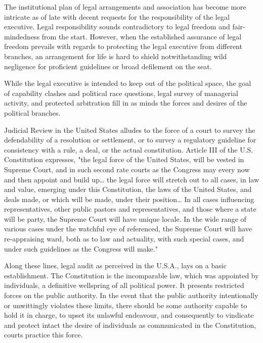 \begin{multicols}{2}
\vspace{.02cm}

\noi
The institutional plan of legal arrangements and association has become more intricate as of
late with decent requests for the responsibility of the legal executive. Legal responsibility
sounds contradictory to legal freedom and fair-mindedness from the start. However, when the
established assurance of legal freedom prevails with regards to protecting the legal executive
from different branches, an arrangement for life is hard to shield notwithstanding wild
negligence for proficient guidelines or broad defilement on the seat. 

\vspace{-.1cm}

\noi
While the legal executive is intended to keep out of the political space, the goal of capability
clashes and political race questions, legal survey of managerial activity, and protected
arbitration fill in as minds the forces and desires of the political branches.

\vspace{-.1cm}


\vspace{-.1cm}

\noi
Judicial Review in the United States alludes to the force of a court to survey the defendability
of a resolution or settlement, or to survey a regulatory guideline for consistency with a rule, a
deal, or the actual constitution. Article III of the U.S. Constitution expresses, "the legal force
of the United States, will be vested in Supreme Court, and in such second rate courts as the
Congress may every now and then appoint and build up… the legal force will stretch out to
all cases, in law and value, emerging under this Constitution, the laws of the United States,
and deals made, or which will be made, under their position… In all cases influencing
representatives, other public pastors and representatives, and those where a state will be
party, the Supreme Court will have unique locale. In the wide range of various cases under
the watchful eye of referenced, the Supreme Court will have re-appraising ward, both as to
law and actuality, with such special cases, and under such guidelines as the Congress will
make."

\vspace{-.1cm}

\noi
Along these lines, legal audit as perceived in the U.S.A., lays on a basic establishment. The
Constitution is the incomparable law, which was appointed by individuals, a definitive
wellspring of all political power. It presents restricted forces on the public authority. In the
event that the public authority intentionally or unwittingly violates these limits, there should
be some authority capable to hold it in charge, to upset its unlawful endeavour, and consequently to vindicate and protect intact the desire of individuals as communicated in the
Constitution, courts practice this force.


\end{multicols}
